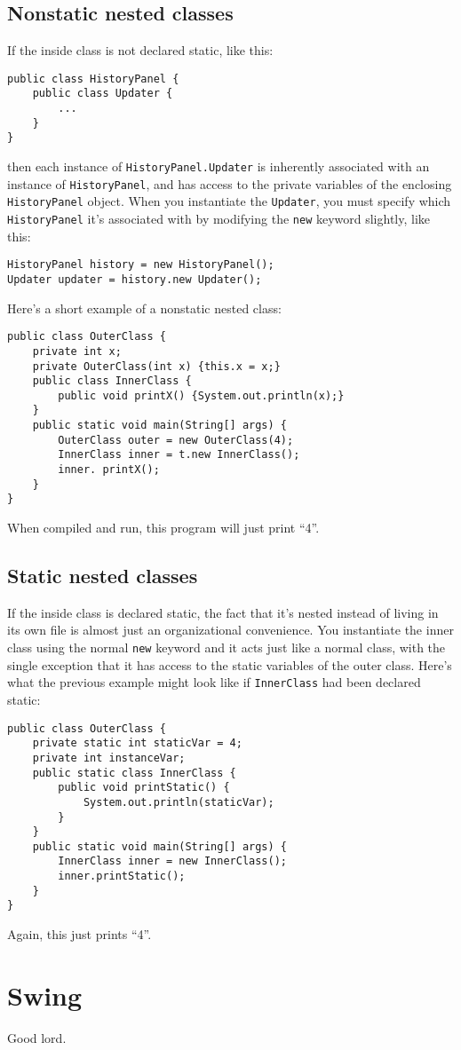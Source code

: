 \documentclass{article}
\begin{document}
\subsection{Nonstatic nested classes}
If the inside class is not declared static, like this:
\begin{verbatim}
public class HistoryPanel {
    public class Updater {
        ...
    }
}
\end{verbatim}
then each instance of \verb!HistoryPanel.Updater! is inherently associated with an instance of \verb!HistoryPanel!, and has access to the private variables of the enclosing \verb!HistoryPanel! object. When you instantiate the \verb!Updater!, you must specify which \verb!HistoryPanel! it's associated with by modifying the \verb!new! keyword slightly, like this:
\begin{verbatim}
HistoryPanel history = new HistoryPanel();
Updater updater = history.new Updater();
\end{verbatim}
Here's a short example of a nonstatic nested class:
\begin{verbatim}
public class OuterClass {
    private int x;
    private OuterClass(int x) {this.x = x;}
    public class InnerClass {
        public void printX() {System.out.println(x);}
    }
    public static void main(String[] args) {
        OuterClass outer = new OuterClass(4);
        InnerClass inner = t.new InnerClass();
        inner. printX();
    }
}
\end{verbatim}
When compiled and run, this program will just print ``4''.

\subsection{Static nested classes}
If the inside class is declared static, the fact that it's nested instead of living in its own file is almost just an organizational convenience. You instantiate the inner class using the normal \verb!new! keyword and it acts just like a normal class, with the single exception that it has access to the static variables of the outer class. Here's what the previous example might look like if \verb!InnerClass! had been declared static:
\begin{verbatim}
public class OuterClass {
    private static int staticVar = 4;
    private int instanceVar;
    public static class InnerClass {
        public void printStatic() {
            System.out.println(staticVar);
        }
    }
    public static void main(String[] args) {
        InnerClass inner = new InnerClass();
        inner.printStatic();
    }
}
\end{verbatim}
Again, this just prints ``4''.

\section{Swing}
Good lord.
\end{document}
